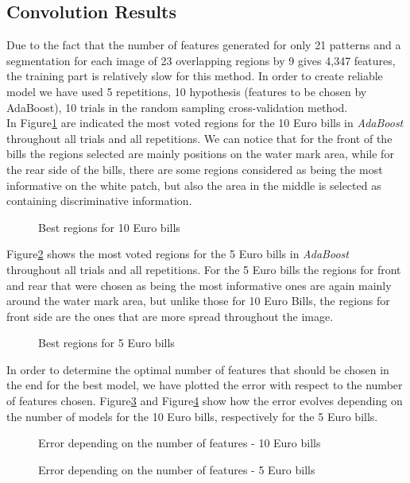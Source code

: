 \documentclass[11pt,twocolumn]{article}
\begin{document}
		\subsection{Convolution Results}\label{sec:haar_results}
		\hspace*{10px}Due to the fact that the number of features generated for only
		21 patterns and a segmentation for each image of 23 overlapping regions by 9
		gives 4,347 features, the training part is relatively slow for this method. In
		order to create reliable model we have used 5 repetitions, 10 hypothesis
		(features to be chosen by AdaBoost), 10 trials in the random sampling
		cross-validation method.\\ \hspace*{10px}In Figure\ref{haar_regions10} are
		indicated the most voted regions for the 10 Euro bills in \emph{AdaBoost}
		throughout all trials and all repetitions. We can notice that for the front of
		the bills the regions selected are mainly positions on the water mark area,
		while for the rear side of the bills, there are some regions considered as
		being the most informative on the white patch, but also the area in the middle
		is selected as containing discriminative information.\\ 
		\begin{figure}[!hbtp]
			\centering
			\caption{Best regions for 10 Euro bills}
			\label{haar_regions10}
		\end{figure}
		\hspace*{10px}Figure\ref{haar_regions5} shows the most voted regions for the 5
		Euro bills in \emph{AdaBoost} throughout all trials and all repetitions. For
		the 5 Euro bills the regions for front and rear that were chosen as being the
		most informative ones are again mainly around the water mark area, but unlike
		those for 10 Euro Bills, the regions for front side are the ones that are more
		spread throughout the image.\\ 
		\begin{figure}[!hbtp]
			\centering
			\caption{Best regions for 5 Euro bills}
			\label{haar_regions5}
		\end{figure} 
		\hspace*{10px}In order to determine the optimal number of features that should
		be chosen in the end for the best model, we have plotted the error with
		respect to the number of features chosen. Figure\ref{haar_plot10} and
		Figure\ref{haar_plot5} show how the error evolves depending on the number of
		models for the 10 Euro bills, respectively for the 5 Euro bills. 
		\begin{figure}[!hbtp]
			\centering
			\caption{Error depending on the number of features - 10 Euro bills}
			\label{haar_plot10}
		\end{figure} 
		\begin{figure}[!hbtp]
			\centering
			\caption{Error depending on the number of features - 5 Euro bills}
			\label{haar_plot5}
		\end{figure} 
	
\end{document}
